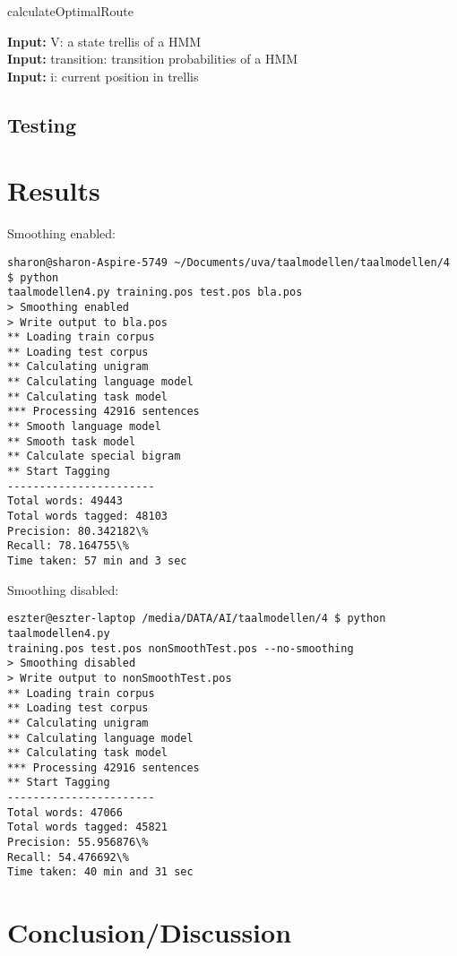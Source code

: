 \documentclass[10pt, a4paper]{article}
\begin{document}
\begin{algorithm}[H]
\caption{calculateOptimalRoute}
\textbf{Input:} V: a state trellis of a HMM\\
\textbf{Input:} transition: transition probabilities of a HMM\\
\textbf{Input:} i: current position in trellis\\


\end{algorithm}

\subsection*{Testing}



\section*{Results}
Smoothing enabled:
\begin{verbatim}
sharon@sharon-Aspire-5749 ~/Documents/uva/taalmodellen/taalmodellen/4 $ python 
taalmodellen4.py training.pos test.pos bla.pos
> Smoothing enabled
> Write output to bla.pos
** Loading train corpus
** Loading test corpus
** Calculating unigram
** Calculating language model
** Calculating task model
*** Processing 42916 sentences
** Smooth language model
** Smooth task model
** Calculate special bigram
** Start Tagging
-----------------------
Total words: 49443
Total words tagged: 48103
Precision: 80.342182\%
Recall: 78.164755\%
Time taken: 57 min and 3 sec
\end{verbatim}
Smoothing disabled:
\begin{verbatim}
eszter@eszter-laptop /media/DATA/AI/taalmodellen/4 $ python taalmodellen4.py 
training.pos test.pos nonSmoothTest.pos --no-smoothing
> Smoothing disabled
> Write output to nonSmoothTest.pos
** Loading train corpus
** Loading test corpus
** Calculating unigram
** Calculating language model
** Calculating task model
*** Processing 42916 sentences
** Start Tagging
-----------------------
Total words: 47066
Total words tagged: 45821
Precision: 55.956876\%
Recall: 54.476692\%
Time taken: 40 min and 31 sec
\end{verbatim}

\section*{Conclusion/Discussion}
\end{document}
